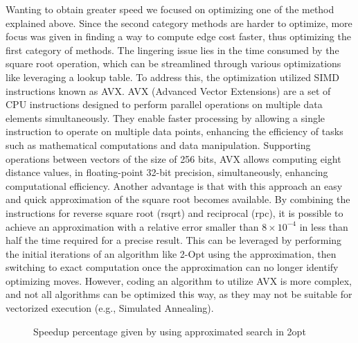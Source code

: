 Wanting to obtain greater speed we focused on optimizing one of the method explained above.
Since the second category methods are harder to optimize, more focus was given in finding a way to compute edge cost faster, thus optimizing the first category of methods.
The lingering issue lies in the time consumed by the square root operation, which can be streamlined through various optimizations like leveraging a lookup table.
To address this, the optimization utilized SIMD instructions known as AVX.
AVX (Advanced Vector Extensions) are a set of CPU instructions designed to perform parallel operations on multiple data elements simultaneously.
They enable faster processing by allowing a single instruction to operate on multiple data points, enhancing the efficiency of tasks such as mathematical computations and data manipulation.
Supporting operations between vectors of the size of 256 bits, AVX allows computing eight distance values, in floating-point 32-bit precision, simultaneously, enhancing computational efficiency.
Another advantage is that with this approach an easy and quick approximation of the square root becomes available.
By combining the instructions for reverse square root (rsqrt) and reciprocal (rpc), it is possible to achieve an approximation with a relative error smaller than $8 \times 10^{-4}$ in less than half the time required for a precise result.
This can be leveraged by performing the initial iterations of an algorithm like 2-Opt using the approximation, then switching to exact computation once the approximation can no longer identify optimizing moves.
However, coding an algorithm to utilize AVX is more complex, and not all algorithms can be optimized this way, as they may not be suitable for vectorized execution (e.g., Simulated Annealing).

\begin{figure}[H]
    \centering
    \caption{Speedup percentage given by using approximated search in 2opt} \label{fig:avxApprox}
\end{figure}

